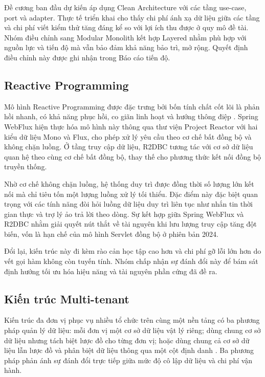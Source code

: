 \documentclass[12pt,a4paper,oneside]{report}
\begin{document}
Đề cương ban đầu dự kiến áp dụng Clean Architecture \cite{clean} với các tầng use-case, port và adapter. Thực tế triển khai cho thấy chi phí ánh xạ dữ liệu giữa các tầng và chi phí viết kiểm thử tăng đáng kể so với lợi ích thu được ở quy mô đề tài. Nhóm điều chỉnh sang Modular Monolith kết hợp Layered nhằm phù hợp với nguồn lực và tiến độ mà vẫn bảo đảm khả năng bảo trì, mở rộng. Quyết định điều chỉnh này được ghi nhận trong Báo cáo tiến độ.

\subsection{Reactive Programming}

Mô hình Reactive Programming được đặc trưng bởi bốn tính chất cốt lõi là phản hồi nhanh, có khả năng phục hồi, co giãn linh hoạt và hướng thông điệp \cite{reactive}. Spring WebFlux hiện thực hóa mô hình này thông qua thư viện Project Reactor với hai kiểu dữ liệu Mono và Flux, cho phép xử lý yêu cầu theo cơ chế bất đồng bộ và không chặn luồng. Ở tầng truy cập dữ liệu, R2DBC tương tác với cơ sở dữ liệu quan hệ theo cùng cơ chế bất đồng bộ, thay thế cho phương thức kết nối đồng bộ truyền thống.

Nhờ cơ chế không chặn luồng, hệ thống duy trì được đồng thời số lượng lớn kết nối mà chỉ tiêu tốn một lượng luồng xử lý tối thiểu. Đặc điểm này đặc biệt quan trọng với các tính năng đòi hỏi luồng dữ liệu duy trì liên tục như nhắn tin thời gian thực và trợ lý ảo trả lời theo dòng. Sự kết hợp giữa Spring WebFlux và R2DBC nhằm giải quyết nút thắt về tài nguyên khi lưu lượng truy cập tăng đột biến, vốn là hạn chế của mô hình Servlet đồng bộ ở phiên bản 2024.

Đổi lại, kiến trúc này đi kèm rào cản học tập cao hơn và chi phí gỡ lỗi lớn hơn do vết gọi hàm không còn tuyến tính. Nhóm chấp nhận sự đánh đổi này để bám sát định hướng tối ưu hóa hiệu năng và tài nguyên phần cứng đã đề ra.

\subsection{Kiến trúc Multi-tenant}

Kiến trúc đa đơn vị phục vụ nhiều tổ chức trên cùng một nền tảng có ba phương pháp quản lý dữ liệu: mỗi đơn vị một cơ sở dữ liệu vật lý riêng; dùng chung cơ sở dữ liệu nhưng tách biệt lược đồ cho từng đơn vị; hoặc dùng chung cả cơ sở dữ liệu lẫn lược đồ và phân biệt dữ liệu thông qua một cột định danh \cite{multitenant}. Ba phương pháp phản ánh sự đánh đổi trực tiếp giữa mức độ cô lập dữ liệu và chi phí vận hành.
\end{document}
